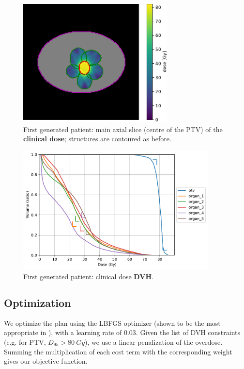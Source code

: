 \begin{figure}
	\centering
	\includegraphics[width=0.7\textwidth]{main_slice-dose.pdf}
	\caption{First generated patient: main axial slice (centre of the PTV) of the \textbf{clinical dose}; structures are contoured as before.}
	\label{fig:main_slice-dose}
\end{figure}
\begin{figure}
	\centering
	\includegraphics[width=0.9\textwidth]{dvh_example.pdf}
	\caption{First generated patient: clinical dose \textbf{DVH}.}
	\label{fig:clinical_dvh}
\end{figure}

\subsection*{Optimization}
We optimize the plan using the LBFGS optimizer (shown to be the most appropriate in \cite{dubois_radiotherapy_2023}), with a learning rate of $0.03$.
Given the list of DVH constraints (e.g. for PTV, $D_{95}>80 \ Gy$), we use a linear penalization of the overdose.
Summing the multiplication of each cost term with the corresponding weight gives our objective function.
